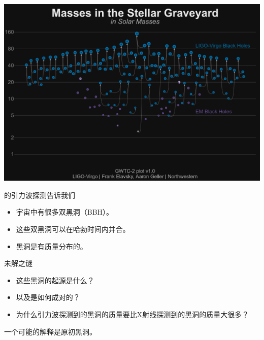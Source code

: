 \documentclass[xcolor={svgnames},compress]{beamer}
\let\olditem\item
\renewcommand{\item}{%
    \olditem\vspace{\fill}}
\begin{document}
\subsection{}
\begin{frame}{}
    \centering
    \includegraphics[width=\textwidth]{Masses_of_Dead_Stars_LIGO_Virgo}
\end{frame}


\begin{frame}{}
    \begin{block}{\lvc 的引力波探测告诉我们}
        \begin{itemize}
            \vspace{2mm}
            \item 宇宙中有很多双黑洞（BBH）。
            \item 这些双黑洞可以在哈勃时间内并合。
            \item 黑洞是有质量分布的。 
        \end{itemize}
    \end{block}
    \begin{alertblock}{未解之谜}
        \begin{itemize}
            \vspace{2mm}
            \item 这些黑洞的起源是什么？
            \item 以及是如何成对的？
            \item 为什么引力波探测到的黑洞的质量要比X射线探测到的黑洞的质量大很多？
        \end{itemize}
    \end{alertblock}
\centering
一个可能的解释是原初黑洞。
\end{frame}
\end{document}
